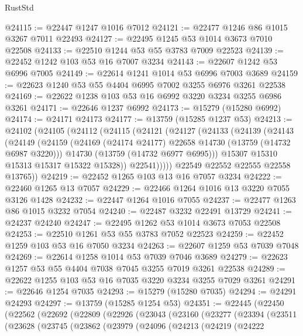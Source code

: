 \begin{lexlean}{RustStd}
\begin{coremodule}
@24115 := @22447 @1247 @1016 @7012
@24121 := @22477 @1246 @86 @1015 @3267 @7011 @22493
@24127 := @22495 @1245 @53 @1014 @3673 @7010 @22508
@24133 := @22510 @1244 @53 @55 @3783 @7009 @22523
@24139 := @22452 @1242 @103 @53 @16 @7007 @3234
@24143 := @22607 @1242 @53 @6996 @7005
@24149 := @22614 @1241 @1014 @53 @6996 @7003 @3689
@24159 := @22623 @1240 @53 @55 @4404 @6995 @7002 @3255 @6976 @3261 @22538
@24169 := @22622 @1238 @103 @53 @16 @6992 @3220 @3234 @3255 @6986 @3261
@24171 := @22646 @1237 @6992
@24173 := @15279 (@15280 @6992)
@24174 := @24171 @24173
@24177 := @13759 (@15285 @1237 @53)
@24213 := @24102
    (@24105
      (@24112
        (@24115
          (@24121
            (@24127
              (@24133
                (@24139
                  (@24143
                    (@24149
                      (@24159
                        (@24169 (@24174 @24177) @22658 @14730 (@13759 (@14732 @6987 @3220)))
                        @14730
                        (@13759 (@14732 @6977 @6995)))
                      @15307
                      @15310
                      @15313
                      @15317
                      @15322
                      @15328))
                  @22541)))))
        @22549
        @22552
        @22555
        @22558
        @13765))
@24219 := @22452 @1265 @103 @13 @16 @7057 @3234
@24222 := @22460 @1265 @13 @7057
@24229 := @22466 @1264 @1016 @13 @3220 @7055 @3126 @1428
@24232 := @22447 @1264 @1016 @7055
@24237 := @22477 @1263 @86 @1015 @3232 @7054
@24240 := @22487 @3232 @22491 @13729
@24241 := @24237 @24240
@24247 := @22495 @1262 @53 @1014 @3673 @7053 @22508
@24253 := @22510 @1261 @53 @55 @3783 @7052 @22523
@24259 := @22452 @1259 @103 @53 @16 @7050 @3234
@24263 := @22607 @1259 @53 @7039 @7048
@24269 := @22614 @1258 @1014 @53 @7039 @7046 @3689
@24279 := @22623 @1257 @53 @55 @4404 @7038 @7045 @3255 @7019 @3261 @22538
@24289 := @22622 @1255 @103 @53 @16 @7035 @3220 @3234 @3255 @7029 @3261
@24291 := @22646 @1254 @7035
@24293 := @15279 (@15280 @7035)
@24294 := @24291 @24293
@24297 := @13759 (@15285 @1254 @53)
@24351 := @22445
    (@22450
      (@22562
        (@22692
          (@22809
            (@22926
              (@23043
                (@23160
                  (@23277
                    (@23394
                      (@23511
                        (@23628
                          (@23745
                            (@23862
                              (@23979
                                (@24096
                                  (@24213
                                    (@24219
                                      (@24222

\end{coremodule}
\end{lexlean}

